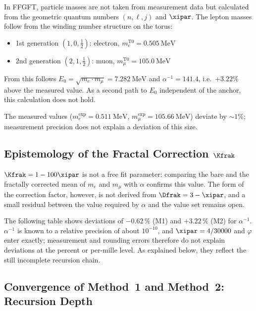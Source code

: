 In FFGFT, particle masses are not taken from measurement data but calculated from the geometric quantum numbers $(n, \ell, j)$ and $\xipar$. The lepton masses follow from the winding number structure on the torus:
\begin{itemize}[noitemsep]
  \item 1st generation $(1,0,\tfrac{1}{2})$: electron, $m_e^{\text{T0}} = 0.505\ \text{MeV}$
  \item 2nd generation $(2,1,\tfrac{1}{2})$: muon, $m_\mu^{\text{T0}} = 105.0\ \text{MeV}$
\end{itemize}

From this follows $E_0 = \sqrt{m_e \cdot m_\mu} = 7.282\ \text{MeV}$ and $\alpha^{-1} = 141.4$, i.e.\ $+3.22\%$ above the measured value. As a second path to $E_0$ independent of the anchor, this calculation does not hold.

The measured values ($m_e^{\text{exp}} = 0.511\ \text{MeV}$, $m_\mu^{\text{exp}} = 105.66\ \text{MeV}$) deviate by $\sim 1\%$; measurement precision does not explain a deviation of this size.

\subsection{\texorpdfstring{Epistemology of the Fractal Correction $\Kfrak$}{Epistemology of the Fractal Correction}}

$\Kfrak = 1 - 100\xipar$ is not a free fit parameter: comparing the bare and the fractally corrected mean of $m_e$ and $m_\mu$ with $\alpha$ confirms this value. The form of the correction factor, however, is not derived from $\Dfrak = 3 - \xipar$, and a small residual between the value required by $\alpha$ and the value set remains open.

\begin{tcolorbox}[colback=T0gray, colframe=T0blue, title=Core statement on precision]
The following table shows deviations of $-0.62\,\%$ (M1) and $+3.22\,\%$ (M2) for $\alpha^{-1}$. $\alpha^{-1}$ is known to a relative precision of about $10^{-10}$, and $\xipar = 4/30000$ and $\varphi$ enter exactly; measurement and rounding errors therefore do not explain deviations at the percent or per-mille level. As explained below, they reflect the still incomplete recursion chain.
\end{tcolorbox}

\subsection{Convergence of Method~1 and Method~2: Recursion Depth}

